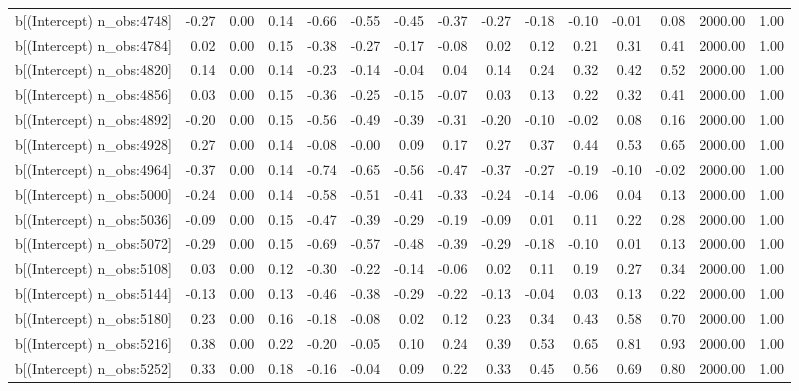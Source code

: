 \begin{table}[ht]
\begin{tabular}{rrrrrrrrrrrrrrr}
  b[(Intercept) n\_obs:4748] & -0.27 & 0.00 & 0.14 & -0.66 & -0.55 & -0.45 & -0.37 & -0.27 & -0.18 & -0.10 & -0.01 & 0.08 & 2000.00 & 1.00 \\ 
  b[(Intercept) n\_obs:4784] & 0.02 & 0.00 & 0.15 & -0.38 & -0.27 & -0.17 & -0.08 & 0.02 & 0.12 & 0.21 & 0.31 & 0.41 & 2000.00 & 1.00 \\ 
  b[(Intercept) n\_obs:4820] & 0.14 & 0.00 & 0.14 & -0.23 & -0.14 & -0.04 & 0.04 & 0.14 & 0.24 & 0.32 & 0.42 & 0.52 & 2000.00 & 1.00 \\ 
  b[(Intercept) n\_obs:4856] & 0.03 & 0.00 & 0.15 & -0.36 & -0.25 & -0.15 & -0.07 & 0.03 & 0.13 & 0.22 & 0.32 & 0.41 & 2000.00 & 1.00 \\ 
  b[(Intercept) n\_obs:4892] & -0.20 & 0.00 & 0.15 & -0.56 & -0.49 & -0.39 & -0.31 & -0.20 & -0.10 & -0.02 & 0.08 & 0.16 & 2000.00 & 1.00 \\ 
  b[(Intercept) n\_obs:4928] & 0.27 & 0.00 & 0.14 & -0.08 & -0.00 & 0.09 & 0.17 & 0.27 & 0.37 & 0.44 & 0.53 & 0.65 & 2000.00 & 1.00 \\ 
  b[(Intercept) n\_obs:4964] & -0.37 & 0.00 & 0.14 & -0.74 & -0.65 & -0.56 & -0.47 & -0.37 & -0.27 & -0.19 & -0.10 & -0.02 & 2000.00 & 1.00 \\ 
  b[(Intercept) n\_obs:5000] & -0.24 & 0.00 & 0.14 & -0.58 & -0.51 & -0.41 & -0.33 & -0.24 & -0.14 & -0.06 & 0.04 & 0.13 & 2000.00 & 1.00 \\ 
  b[(Intercept) n\_obs:5036] & -0.09 & 0.00 & 0.15 & -0.47 & -0.39 & -0.29 & -0.19 & -0.09 & 0.01 & 0.11 & 0.22 & 0.28 & 2000.00 & 1.00 \\ 
  b[(Intercept) n\_obs:5072] & -0.29 & 0.00 & 0.15 & -0.69 & -0.57 & -0.48 & -0.39 & -0.29 & -0.18 & -0.10 & 0.01 & 0.13 & 2000.00 & 1.00 \\ 
  b[(Intercept) n\_obs:5108] & 0.03 & 0.00 & 0.12 & -0.30 & -0.22 & -0.14 & -0.06 & 0.02 & 0.11 & 0.19 & 0.27 & 0.34 & 2000.00 & 1.00 \\ 
  b[(Intercept) n\_obs:5144] & -0.13 & 0.00 & 0.13 & -0.46 & -0.38 & -0.29 & -0.22 & -0.13 & -0.04 & 0.03 & 0.13 & 0.22 & 2000.00 & 1.00 \\ 
  b[(Intercept) n\_obs:5180] & 0.23 & 0.00 & 0.16 & -0.18 & -0.08 & 0.02 & 0.12 & 0.23 & 0.34 & 0.43 & 0.58 & 0.70 & 2000.00 & 1.00 \\ 
  b[(Intercept) n\_obs:5216] & 0.38 & 0.00 & 0.22 & -0.20 & -0.05 & 0.10 & 0.24 & 0.39 & 0.53 & 0.65 & 0.81 & 0.93 & 2000.00 & 1.00 \\ 
  b[(Intercept) n\_obs:5252] & 0.33 & 0.00 & 0.18 & -0.16 & -0.04 & 0.09 & 0.22 & 0.33 & 0.45 & 0.56 & 0.69 & 0.80 & 2000.00 & 1.00 \\ 

\end{tabular}
\end{table}
